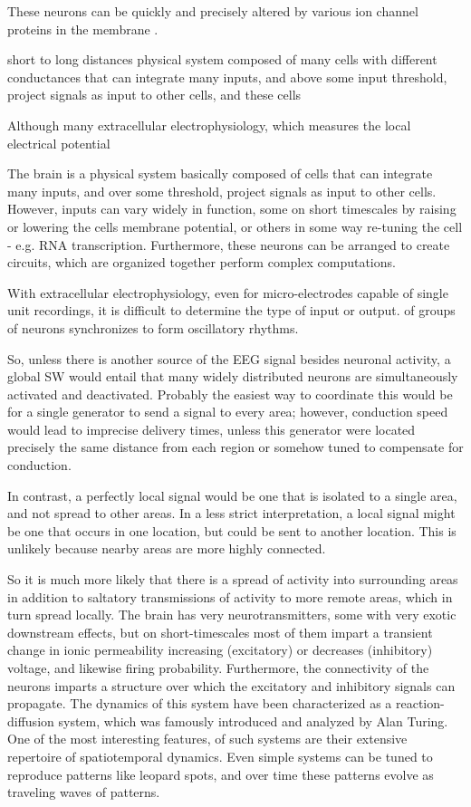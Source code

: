 These neurons can be quickly and precisely altered by various ion channel proteins in the membrane .  

short to long distances  physical system composed of many cells with different conductances that can integrate many inputs, and above some input threshold, project signals as input to other cells, and these cells 

Although many extracellular electrophysiology, which measures the local electrical potential 

The brain is a physical system basically composed of cells that can integrate many inputs, and over some threshold, project signals as input to other cells. However, inputs can vary widely in function, some on short timescales by raising or lowering the cells membrane potential, or others in some way re-tuning the cell - e.g. RNA transcription. Furthermore, these neurons can be arranged to create circuits, which are organized together perform complex computations.

With extracellular electrophysiology, even for micro-electrodes capable of single unit recordings, it is difficult to determine the type of input or output. 
 of groups of neurons synchronizes to form oscillatory rhythms. 

So, unless there is another source of the EEG signal besides neuronal activity, a global SW would entail that many widely distributed neurons are simultaneously activated and deactivated. Probably the easiest way to coordinate this would be for a single generator to send a signal to every area; however, conduction speed would lead to imprecise delivery times, unless this generator were located precisely the same distance from each region or somehow tuned to compensate for conduction.

In contrast, a perfectly local signal would be one that is isolated to a single area, and not spread to other areas. In a less strict interpretation, a local signal might be one that occurs in one location, but could be sent to another location. This is unlikely because nearby areas are more highly connected.

So it is much more likely that there is a spread of activity into surrounding areas in addition to saltatory transmissions of activity to more remote areas, which in turn spread locally.
The brain has very neurotransmitters, some with very exotic downstream effects, but on short-timescales most of them impart a transient change in ionic permeability increasing (excitatory) or decreases (inhibitory) voltage, and likewise firing probability. Furthermore, the connectivity of the neurons imparts a structure over which the excitatory and inhibitory signals can propagate. The dynamics of this system have been characterized as a reaction-diffusion system, which was famously introduced and analyzed by Alan Turing. One of the most interesting features, of such systems are their extensive repertoire of spatiotemporal dynamics. Even simple systems can be tuned to reproduce patterns like leopard spots, and over time these patterns evolve as traveling waves of patterns. \citep{Turing1952}

